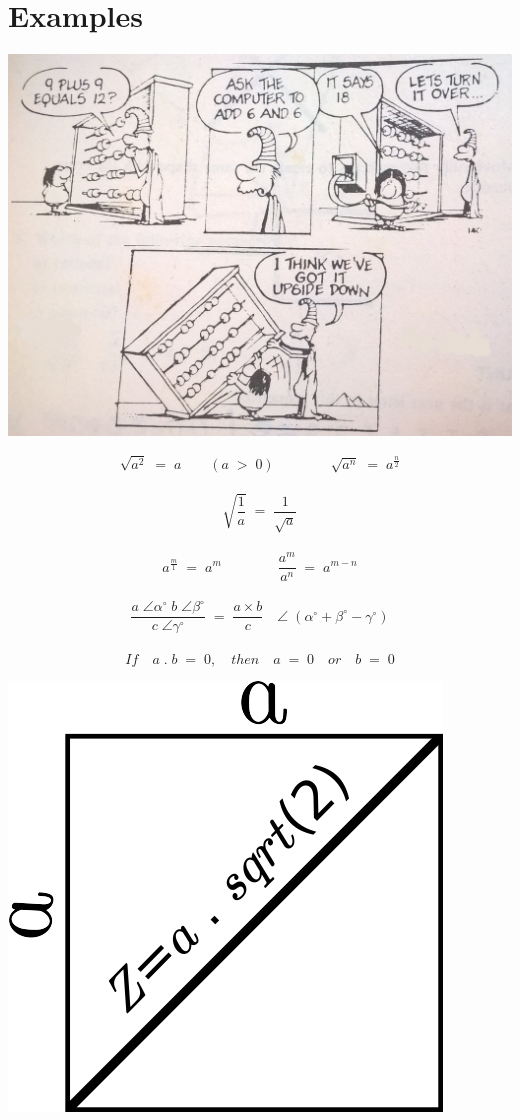 \section{Examples}
\begin{minipage}{\linewidth}
	\includegraphics[scale=0.2]{./image/upsidedown.jpg}
\end{minipage}
\minipagespace{.2cm}
\[\sqrt{a^2} \; = \; a \qquad (a \; > \; 0) \qquad \qquad \sqrt{a^n} \; = \; a^{\frac{n}{2}}\] \\
\[\sqrt{\frac{1}{a}} \; = \; \frac{1}{\sqrt{a}}\] \\
\[a^{\frac{m}{1}} \; = \; a^m \qquad \qquad \frac{a^m}{a^n} \; = \; a^{m-n}\] \\
\[\frac{a \; \angle \alpha^\circ \; b \; \angle \beta^\circ}{c \; \angle \gamma^\circ} \; = \; \frac{a \times b}{c} \quad \angle \; (\alpha^\circ + \beta^\circ - \gamma^\circ)\] {\tiny \cite{book-12}}
\\
\[If \quad a \; . \; b \; = \; 0, \quad then \quad a \; = \; 0 \quad or \quad b \; = \; 0\]
\emptyline
\begin{minipage}{0.60\linewidth}
	\includegraphics[scale=0.5]{./image/squareproperty.png}
\end{minipage}
